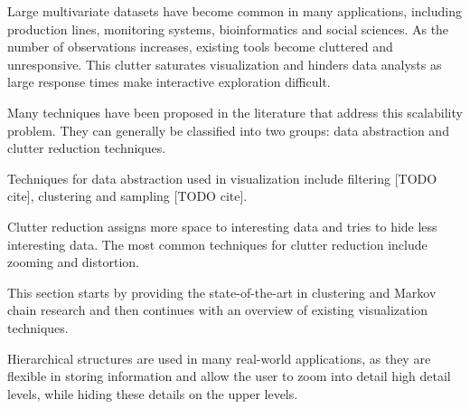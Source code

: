 Large multivariate datasets have become common in many applications, including production lines,
monitoring systems, bioinformatics and social sciences. As the number of observations increases,
existing tools become cluttered and unresponsive. This clutter saturates visualization and hinders
data analysts as large response times make interactive exploration difficult.

Many techniques have been proposed in the literature that address this scalability problem.
They can generally be classified into two groups: data abstraction and clutter reduction 
techniques.

Techniques for data abstraction used in visualization include filtering [TODO cite], clustering
and sampling [TODO cite].

Clutter reduction assigns more space to interesting data and tries to hide less interesting data.
The most common techniques for clutter reduction include zooming and distortion.

This section starts by providing the state-of-the-art in clustering and Markov chain research and
then continues with an overview of existing visualization techniques.

Hierarchical structures are used in many real-world applications, as they are flexible in storing information
and allow the user to zoom into detail high detail levels, while hiding these details on the upper levels.

